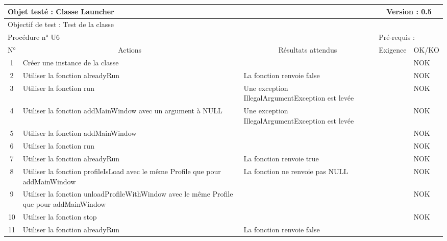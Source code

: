 \documentclass{../res/univ-projet}
\begin{document}
\begin{center}
	
    \begin{tabular}{|c|p{5cm}|p{5cm}|p{1.5cm}|p{1.5cm}|}
      \hline
      \multicolumn{3}{|l|}{Objet testé : Classe Launcher} & \multicolumn{2}{c|}{Version : 0.5}\\ \hline
      \multicolumn{5}{|l|}{Objectif de test : Test de la classe}\\ \hline
      \multicolumn{3}{|l|}{Procédure n° U6} & \multicolumn{2}{p{3cm}|}{Pré-requis : }\\ \hline
      \multicolumn{1}{|c|}{N°} & \multicolumn{1}{c|}{Actions} & \multicolumn{1}{c|}{Résultats attendus} & 
      \multicolumn{1}{c|}{Exigence} & \multicolumn{1}{c|}{OK/KO}\\ \hline
      1 & Créer une instance de la classe &  &  & NOK \\
      2 & Utiliser la fonction alreadyRun & La fonction renvoie false &  & NOK \\
      3 & Utiliser la fonction run & Une exception IllegalArgumentException est levée &  & NOK \\
      4 & Utiliser la fonction addMainWindow avec un argument à NULL & Une exception IllegalArgumentException est levée &  & NOK \\
      5 & Utiliser la fonction addMainWindow & &  & NOK \\
	    6 & Utiliser la fonction run &  &  & NOK \\
      7 & Utiliser la fonction alreadyRun & La fonction renvoie true &  & NOK \\
      8 & Utiliser la fonction profileIsLoad avec le même Profile que pour addMainWindow & La fonction ne renvoie pas NULL &  & NOK \\
      9 & Utiliser la fonction unloadProfileWithWindow avec le même Profile que pour addMainWindow &  &  & NOK \\
      10 & Utiliser la fonction stop &  &  & NOK \\
      11 & Utiliser la fonction alreadyRun & La fonction renvoie false &  &\\ 
	\hline
    \end{tabular}
    \vskip 2.2cm
	

\end{center}
\end{document}
